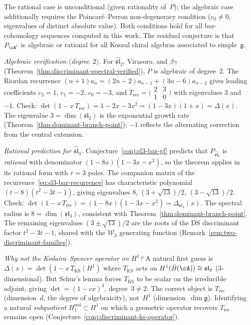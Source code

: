 \begin{remark}%
\label{rem:discriminant-spectral-scope}
The rational case is unconditional (given rationality of~$P$);
the algebraic case additionally requires the Poincar\'e--Perron
non-degeneracy condition ($c_0 \neq 0$, eigenvalues of distinct
absolute value).  Both conditions hold for all bar-cohomology
sequences computed in this work.  The residual conjecture is
that $P_{\cA^!}$ is algebraic or rational for all Koszul chiral
algebras associated to simple~$\mathfrak{g}$.

\emph{Algebraic verification $($degree~$2)$.}
For $\widehat{\mathfrak{sl}}_2$, Virasoro, and $\beta\gamma$
(Theorem~\ref{thm:discriminant-spectral-verified}), $P$ is
algebraic of degree~$2$.
The Riordan recurrence
$(n{+}1) a_n = (2n{-}2) a_{n-1} + (3n{-}6) a_{n-2}$
gives leading coefficients $c_2 = 1$, $c_1 = -2$, $c_0 = -3$,
and $T_{\mathrm{rec}} = \bigl(\begin{smallmatrix} 2 & 3 \\ 1 &
0 \end{smallmatrix}\bigr)$ with eigenvalues $3$ and $-1$.
Check: $\det(1 - x\,T_{\mathrm{rec}}) = 1 - 2x - 3x^2
= (1-3x)(1+x) = \Delta(x)$.  The eigenvalue
$3 = \dim(\mathfrak{sl}_2)$ is the exponential growth rate
(Theorem~\ref{thm:dominant-branch-point});
$-1$ reflects the alternating correction from the central
extension.

\emph{Rational prediction for $\widehat{\mathfrak{sl}}_3$.}
Conjecture~\ref{conj:sl3-bar-gf} predicts that
$P_{\widehat{\mathfrak{sl}}_3}$ is \emph{rational} with
denominator $(1-8x)(1-3x-x^2)$, so the theorem applies
in its rational form with $r = 3$ poles.
The companion matrix of the recurrence~\eqref{eq:sl3-bar-recurrence}
has characteristic polynomial $(t-8)(t^2-3t-1)$, giving
eigenvalues $8$, $(3+\sqrt{13})/2$, $(3-\sqrt{13})/2$.
Check: $\det(1 - x\,T_{\mathrm{rec}})
= (1-8x)(1-3x-x^2) = \Delta_{\mathfrak{sl}_3}(x)$.
The spectral radius is $8 = \dim(\mathfrak{sl}_3)$,
consistent with Theorem~\ref{thm:dominant-branch-point}.
The remaining eigenvalues
$(3 \pm \sqrt{13})/2$ are the roots of the DS discriminant
factor $t^2 - 3t - 1$, shared with the $\mathcal{W}_3$ generating
function (Remark~\ref{rem:two-discriminant-families}).

\emph{Why not the Kodaira--Spencer operator on $H^1$?}
A natural first guess is
$\Delta(x) = \det(1 - x\, T_{\mathrm{KS}} \mid H^1)$
where $T_{\mathrm{KS}}$ acts on
$H^1(\bar{B}(\cA)) \cong \mathfrak{sl}_2$ ($3$-dimensional).
But Schur's lemma forces $T_{\mathrm{KS}}$ to be scalar on the
irreducible adjoint, giving $\det = (1-cx)^3$, degree~$3 \neq 2$.
The correct object is $T_{\mathrm{rec}}$ (dimension~$d$, the
degree of algebraicity), not~$H^1$ (dimension~$\dim\mathfrak{g}$).
Identifying a natural \emph{subquotient} $H^{\mathrm{red}}_1
\subset H^1$ on which a geometric operator recovers
$T_{\mathrm{rec}}$ remains open
(Conjecture~\ref{conj:discriminant-ks-operator}).


\end{remark}
